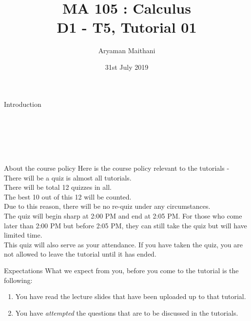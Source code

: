 \documentclass[handout, aspectratio=169]{beamer}
\title{MA 105 : Calculus\\ D1 - T5, Tutorial 01}
\author{Aryaman Maithani}
\date[31-07-2019]{31st July 2019}
\institute[IITB]{IIT Bombay}
\begin{document}
\begin{frame}
    \titlepage
\end{frame}

\begin{frame}{Introduction}
    \\
    \\
    \\
    \\
    \\
    \\
\end{frame}
\begin{frame}{About the course policy}
    Here is the course policy relevant to the tutorials -\\
    There will be a quiz is almost all tutorials.\\
    There will be total 12 quizzes in all.\\
    The best 10 out of this 12 will be counted.\\
    Due to this reason, there will be no re-quiz under any circumstances.\\
    The quiz will begin sharp at 2:00 PM and end at 2:05 PM. For those who come later than 2:00 PM but before 2:05 PM, they can still take the quiz but will have limited time.\\
    This quiz will also serve as your attendance. If you have taken the quiz, you are not allowed to leave the tutorial until it has ended.
\end{frame}
\begin{frame}{Expectations}
    What we expect from you, before you come to the tutorial is the following:
    \begin{enumerate}
        \item You have read the lecture slides that have been uploaded up to that tutorial.
        \item You have \emph{attempted} the questions that are to be discussed in the tutorials.
    \end{enumerate}
\end{frame}
\end{document}
